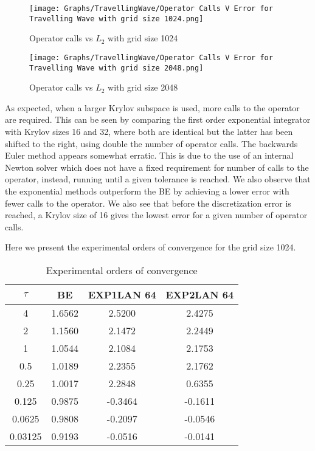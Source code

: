 \begin{figure}[H]
    \centering
    \begin{minipage}{0.49\textwidth}
        \texttt{[image: Graphs/TravellingWave/Operator Calls V Error for Travelling Wave with grid size 1024.png]} %
        \caption{Operator calls vs $L_2$ with grid size 1024}
        \label{fig:plot1}
    \end{minipage}\hfill
    \centering
    \begin{minipage}{0.49\textwidth}
        \texttt{[image: Graphs/TravellingWave/Operator Calls V Error for Travelling Wave with grid size 2048.png]} %
        \caption{Operator calls vs $L_2$ with grid size 2048}
        \label{fig:plot2}
    \end{minipage}\hfill
\end{figure}

As expected, when a larger Krylov subspace is used, more calls to the operator are required.
This can be seen by comparing the first order exponential integrator with Krylov sizes 16 and 32, where both are identical but the latter has been shifted to the right, using double the number of operator calls.
The backwards Euler method appears somewhat erratic.
This is due to the use of an internal Newton solver which does not have a fixed requirement for number of calls to the operator, instead, running until a given tolerance is reached.
We also observe that the exponential methods outperform the BE by achieving a lower error with fewer calls to the operator.
We also see that before the discretization error is reached, a Krylov size of 16 gives the lowest error for a given number of operator calls.

Here we present the experimental orders of convergence for the grid size 1024.

\begin{table}[H]
    \centering
    \begin{tabular}{| c | c | c | c |}
    \hline
    $\tau$ & BE & EXP1LAN 64 & EXP2LAN 64 \\
    \hline
    4 & 1.6562 & 2.5200 & 2.4275 \\
    2 & 1.1560 & 2.1472 & 2.2449 \\
    1 & 1.0544 & 2.1084 & 2.1753 \\
    0.5 & 1.0189 & 2.2355 & 2.1762 \\
    0.25 & 1.0017 & 2.2848 & 0.6355 \\
    0.125 & 0.9875 & -0.3464 & -0.1611 \\
    0.0625 & 0.9808 & -0.2097 & -0.0546 \\
    0.03125 & 0.9193 & -0.0516 & -0.0141 \\
    \hline
    \end{tabular}
    \caption{Experimental orders of convergence}
    \label{tab:EOCs}
\end{table}


